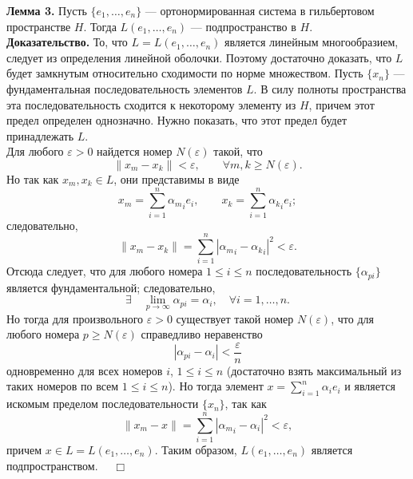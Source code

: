\documentclass[12pt,a4paper, titlepage]{article}
\begin{document}
\textbf{Лемма 3.} Пусть $\{e_1, \ldots ,e_n\}$ --- ортонормированная система в гильбертовом пространстве $H$. Тогда
$L(e_1, \ldots, e_n)$ --- подпространство в $H$.\\
\textbf{Доказательство.} То, что $L = L(e_1, \ldots, e_n)$ является линейным многообразием, следует из определения линейной оболочки. Поэтому достаточно доказать, что $L$ будет замкнутым относительно сходимости по норме множеством.
Пусть $\{x_n\}$ --- фундаментальная последовательность элементов $L$. В силу полноты пространства эта последовательность сходится к некоторому элементу из $H$, причем этот предел определен однозначно. Нужно показать, что этот предел будет принадлежать $L$.\\

Для любого $\varepsilon > 0$ найдется номер $N(\varepsilon)$ такой, что 
$$
\|x_m - x_k\| < \varepsilon, \qquad \forall m, k \geqslant N(\varepsilon). 
$$ 
Но так как $x_m, x_k \in L$, они представимы в виде
$$
x_m = \sum_{i=1}^n {{\alpha}_m}_i e_i, \qquad x_k = \sum_{i=1}^n {{\alpha}_k}_i e_i;
$$
следовательно,
$$
\|x_m - x_k\| = \sum_{i=1}^n |{{\alpha}_m}_i - {{\alpha}_k}_i|^2 < \varepsilon.
$$
Отсюда следует, что для любого номера $1 \leqslant i \leqslant n$ последовательность $\{{\alpha}_{pi}\}$ является фундаментальной; следовательно,
$$
\exists \quad \lim_{p \to \infty} {\alpha}_{pi} = {\alpha}_i, \quad \forall i = 1,\ldots, n.
$$ 
Но тогда для произвольного $\varepsilon > 0$ существует такой номер $N(\varepsilon)$, что для любого номера $p \geqslant N(\varepsilon)$ справедливо неравенство
$$
|{\alpha}_{pi} - {\alpha}_i| < \frac{\varepsilon}{n}
$$
одновременно для всех номеров $i$, $1 \leqslant i \leqslant n$ (достаточно взять максимальный из таких номеров по всем $1 \leqslant i \leqslant n$). Но тогда элемент $x = \sum\limits_{i=1}^n {\alpha}_i e_i$ и является искомым пределом последовательности $\{x_n\}$, так как
$$
\|x_m - x\| = \sum_{i=1}^n |{{\alpha}_m}_i - {\alpha}_i|^2 < \varepsilon,
$$
причем $x \in L = L(e_1, \ldots, e_n)$. Таким образом, $L(e_1, \ldots, e_n)$ является подпространством. $\quad \Box$\\
\end{document}
